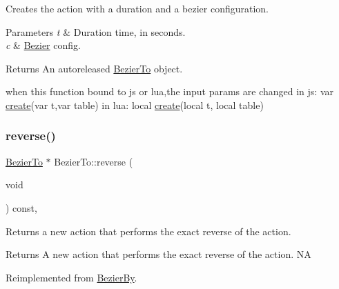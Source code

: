 Creates the action with a duration and a bezier configuration. 
\begin{DoxyParams}{Parameters}
{\em t} & Duration time, in seconds. \\
\hline
{\em c} & \hyperlink{structBezier}{Bezier} config. \\
\hline
\end{DoxyParams}
\begin{DoxyReturn}{Returns}
An autoreleased \hyperlink{classBezierTo}{Bezier\+To} object. 
\begin{DoxyCode}
when \textcolor{keyword}{this} \textcolor{keyword}{function} bound to js or lua,the input params are changed
in js: var \hyperlink{classBezierTo_ab101906196726dc6cd446999064292ff}{create}(var t,var table)
in lua: local \hyperlink{classBezierTo_ab101906196726dc6cd446999064292ff}{create}(local t, local table)
\end{DoxyCode}
 
\end{DoxyReturn}
\mbox{\label{classBezierTo_a18d090decbea9839a379121a012063f6}} 
\subsubsection{\texorpdfstring{reverse()}{reverse()}\hspace{0.1cm}{\footnotesize\ttfamily [1/2]}}
{\footnotesize\ttfamily \hyperlink{classBezierTo}{Bezier\+To} $\ast$ Bezier\+To\+::reverse (\begin{DoxyParamCaption}\item[{void}]{ }\end{DoxyParamCaption}) const\hspace{0.3cm}{\ttfamily [override]}, {\ttfamily [virtual]}}

Returns a new action that performs the exact reverse of the action.

\begin{DoxyReturn}{Returns}
A new action that performs the exact reverse of the action.  NA 
\end{DoxyReturn}


Reimplemented from \hyperlink{classBezierBy_a6b767fe2cddd49ad43cc2724684e3810}{Bezier\+By}.

\mbox{\label{classBezierTo_a96685cb733eb9f61b6e6550bcd210f93}} 
